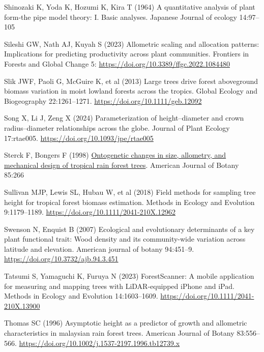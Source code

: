 \documentclass[
  12pt,
  letterpaper,
  DIV=11,
  numbers=noendperiod]{scrartcl}
\newlength{\cslhangindent}
\newenvironment{CSLReferences}[2] %
 {\begin{list}{}{%
  \setlength{\itemindent}{0pt}
  \setlength{\leftmargin}{0pt}
  \setlength{\parsep}{0pt}
  \ifodd #1
   \setlength{\leftmargin}{\cslhangindent}
   \setlength{\itemindent}{-1\cslhangindent}
  \fi
  \setlength{\itemsep}{#2\baselineskip}}}
 {\end{list}}
\begin{document}
\begin{CSLReferences}{1}{1}
Shinozaki K, Yoda K, Hozumi K, Kira T (1964) A quantitative analysis of
plant form-the pipe model theory: I. Basic analyses. Japanese Journal of
ecology 14:97--105

Sileshi GW, Nath AJ, Kuyah S (2023) Allometric scaling and allocation
patterns: {Implications} for predicting productivity across plant
communities. Frontiers in Forests and Global Change 5:
\url{https://doi.org/10.3389/ffgc.2022.1084480}

Slik JWF, Paoli G, McGuire K, et al (2013) Large trees drive forest
aboveground biomass variation in moist lowland forests across the
tropics. Global Ecology and Biogeography 22:1261--1271.
\url{https://doi.org/10.1111/geb.12092}

Song X, Li J, Zeng X (2024) Parameterization of height--diameter and
crown radius--diameter relationships across the globe. Journal of Plant
Ecology 17:rtae005. \url{https://doi.org/10.1093/jpe/rtae005}

Sterck F, Bongers F (1998)
\href{https://www.ncbi.nlm.nih.gov/pubmed/21684910}{Ontogenetic changes
in size, allometry, and mechanical design of tropical rain forest
trees}. American Journal of Botany 85:266

Sullivan MJP, Lewis SL, Hubau W, et al (2018) Field methods for sampling
tree height for tropical forest biomass estimation. Methods in Ecology
and Evolution 9:1179--1189.
\url{https://doi.org/10.1111/2041-210X.12962}

Swenson N, Enquist B (2007) Ecological and evolutionary determinants of
a key plant functional trait: {Wood} density and its community-wide
variation across latitude and elevation. American journal of botany
94:451--9. \url{https://doi.org/10.3732/ajb.94.3.451}

Tatsumi S, Yamaguchi K, Furuya N (2023) {ForestScanner}: {A} mobile
application for measuring and mapping trees with {LiDAR}-equipped
{iPhone} and {iPad}. Methods in Ecology and Evolution 14:1603--1609.
\url{https://doi.org/10.1111/2041-210X.13900}

Thomas SC (1996) Asymptotic height as a predictor of growth and
allometric characteristics in malaysian rain forest trees. American
Journal of Botany 83:556--566.
\url{https://doi.org/10.1002/j.1537-2197.1996.tb12739.x}


\end{CSLReferences}
\end{document}
